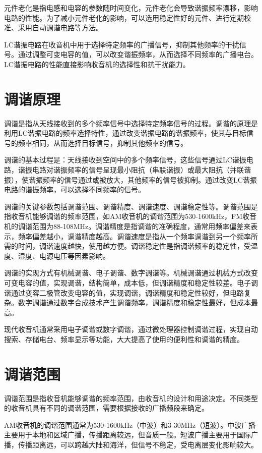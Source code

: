 \documentclass[12pt,UTF8]{ctexbook}
\begin{document}
元件老化是指电感和电容的参数随时间变化，元件老化会导致谐振频率漂移，影响电路的性能。为了减小元件老化的影响，可以选用稳定性好的元件、进行定期校准、采用自动调谐电路等方法。

LC谐振电路在收音机中用于选择特定频率的广播信号，抑制其他频率的干扰信号。通过调整可变电容的值，可以改变谐振频率，从而选择不同频率的广播电台。LC谐振电路的性能直接影响收音机的选择性和抗干扰能力。

\section{调谐原理}

调谐是指从天线接收到的多个频率信号中选择特定频率信号的过程。调谐的原理是利用LC谐振电路的频率选择特性，通过改变谐振电路的谐振频率，使其与目标信号的频率相同，从而选择目标信号，抑制其他频率的信号。

调谐的基本过程是：天线接收到空间中的多个频率信号，这些信号通过LC谐振电路，谐振电路对谐振频率的信号呈现最小阻抗（串联谐振）或最大阻抗（并联谐振），使谐振频率的信号通过或被放大，其他频率的信号被抑制。通过改变LC谐振电路的谐振频率，可以选择不同频率的信号。

调谐的关键参数包括调谐范围、调谐精度、调谐速度、调谐稳定性等。调谐范围是指收音机能够调谐的频率范围，如AM收音机的调谐范围为530-1600kHz，FM收音机的调谐范围为88-108MHz。调谐精度是指调谐的准确程度，通常用频率偏差来表示，频率偏差越小，调谐精度越高。调谐速度是指从一个频率调谐到另一个频率所需的时间，调谐速度越快，使用越方便。调谐稳定性是指调谐频率的稳定性，受温度、湿度、电源电压等因素影响。

调谐的实现方式有机械调谐、电子调谐、数字调谐等。机械调谐通过机械方式改变可变电容的值，实现调谐，结构简单，成本低，但调谐精度和稳定性较差。电子调谐通过变容二极管改变电容的值，实现调谐，调谐精度和稳定性较好，但电路复杂。数字调谐通过数字合成技术产生调谐频率，调谐精度和稳定性最好，但成本最高。

现代收音机通常采用电子调谐或数字调谐，通过微处理器控制调谐过程，实现自动搜索、存储电台、频率显示等功能，大大提高了使用的便利性和调谐的精度。

\section{调谐范围}

调谐范围是指收音机能够调谐的频率范围，由收音机的设计和用途决定。不同类型的收音机具有不同的调谐范围，需要根据接收的广播频段来确定。

AM收音机的调谐范围通常为530-1600kHz（中波）和3-30MHz（短波）。中波广播主要用于本地和区域广播，传播距离较远，但音质一般。短波广播主要用于国际广播，传播距离远，可以跨越大陆和海洋，但信号不稳定，受电离层变化影响较大。
\end{document}
